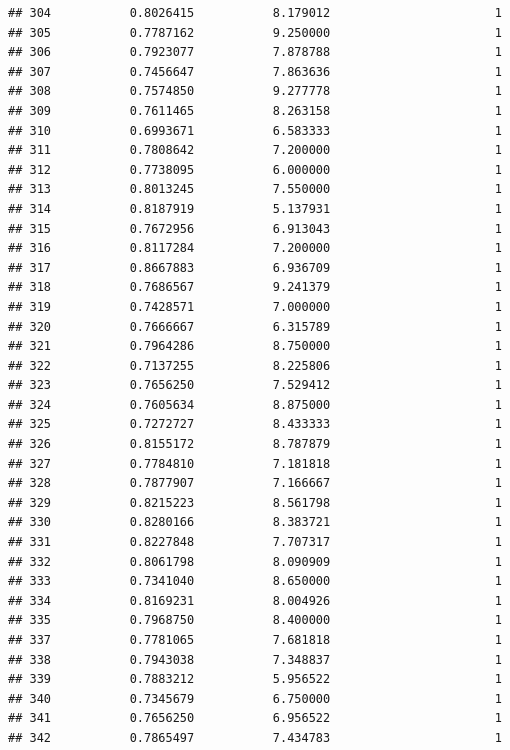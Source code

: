 \documentclass[]{article}
\begin{document}
\begin{verbatim}
## 304           0.8026415           8.179012                       1
## 305           0.7787162           9.250000                       1
## 306           0.7923077           7.878788                       1
## 307           0.7456647           7.863636                       1
## 308           0.7574850           9.277778                       1
## 309           0.7611465           8.263158                       1
## 310           0.6993671           6.583333                       1
## 311           0.7808642           7.200000                       1
## 312           0.7738095           6.000000                       1
## 313           0.8013245           7.550000                       1
## 314           0.8187919           5.137931                       1
## 315           0.7672956           6.913043                       1
## 316           0.8117284           7.200000                       1
## 317           0.8667883           6.936709                       1
## 318           0.7686567           9.241379                       1
## 319           0.7428571           7.000000                       1
## 320           0.7666667           6.315789                       1
## 321           0.7964286           8.750000                       1
## 322           0.7137255           8.225806                       1
## 323           0.7656250           7.529412                       1
## 324           0.7605634           8.875000                       1
## 325           0.7272727           8.433333                       1
## 326           0.8155172           8.787879                       1
## 327           0.7784810           7.181818                       1
## 328           0.7877907           7.166667                       1
## 329           0.8215223           8.561798                       1
## 330           0.8280166           8.383721                       1
## 331           0.8227848           7.707317                       1
## 332           0.8061798           8.090909                       1
## 333           0.7341040           8.650000                       1
## 334           0.8169231           8.004926                       1
## 335           0.7968750           8.400000                       1
## 337           0.7781065           7.681818                       1
## 338           0.7943038           7.348837                       1
## 339           0.7883212           5.956522                       1
## 340           0.7345679           6.750000                       1
## 341           0.7656250           6.956522                       1
## 342           0.7865497           7.434783                       1

\end{verbatim}
\end{document}

